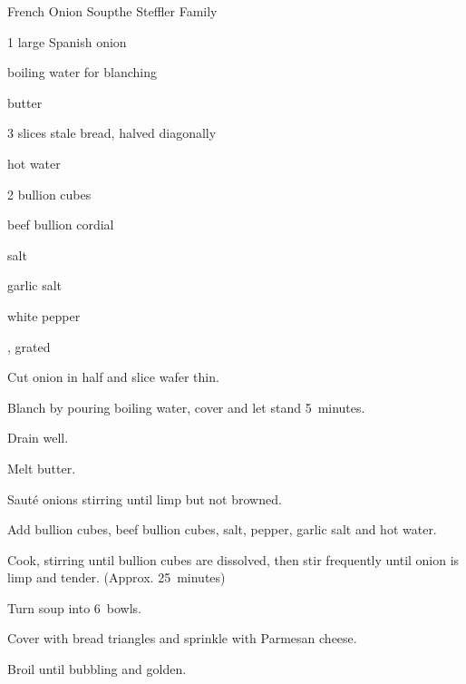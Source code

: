 \begin{recipe}{French Onion Soup}{the Steffler Family}{}

\begin{ingredients}
\item 1 large Spanish onion
\item boiling water for blanching
\item \C{\quarter} butter
\item 3 slices stale bread, halved diagonally
\item {} hot water
\item 2 bullion cubes
\item \C{\quarter} beef bullion cordial
\item {} salt
\item \tp{\eighth} garlic salt
\item \tp{\eighth} white pepper
\item \C{\half} , grated
\end{ingredients}

\begin{directions}
\item Cut onion in half and slice wafer thin.
\item Blanch by pouring boiling water, cover and let stand 5~minutes.
\item Drain well.
\item Melt butter.
\item Saut\'e onions stirring until limp but not browned.
\item Add bullion cubes, beef bullion cubes, salt, pepper, garlic salt and hot water.
\item Cook, stirring until bullion cubes are dissolved, then stir frequently until onion is limp and tender. (Approx. 25~minutes)
\item Turn soup into 6~bowls.
\item Cover with bread triangles and sprinkle with Parmesan cheese.
\item Broil until bubbling and golden.
\end{directions}
\end{recipe}
